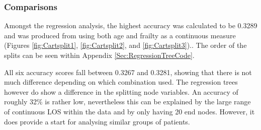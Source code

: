 \documentclass[../thesis.tex]{subfiles}
\begin{document}
\subsubsection{Comparisons}
Amongst the regression analysis, the highest accuracy was calculated to be 0.3289 and was produced from using both age and frailty as a continuous measure (Figures \ref{fig:Cartsplit1}, \ref{fig:Cartsplit2}, and \ref{fig:Cartsplit3}).. The order of the splits can be seen within Appendix \ref{Sec:RegressionTreeCode}. 

All six accuracy scores fall between 0.3267 and 0.3281, showing that there is not much difference depending on which combination used. The regression trees however do show a difference in the splitting node variables. An accuracy of roughly 32\% is rather low, nevertheless this can be explained by the large range of continuous LOS within the data and by only having 20 end nodes. However, it does provide a start for analysing similar groups of patients.

\begin{table}[h!]
\begin{adjustwidth}{0cm}{}
\centering{}
\caption{Continuous LOS Accuracy Results}
\label{Tab:ContinuousLOS}
\end{adjustwidth}
\end{table}
\end{document}
